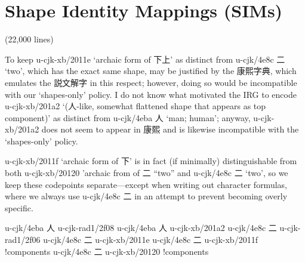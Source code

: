 \begin{multicols}{2}
\endgroup{}\end{multicols}\null\newpage{}\begin{multicols}{2}\end{multicols}
\section{Shape Identity Mappings (SIMs)
}
\begin{multicols}{2}(22,000 lines)\mktsShowpar\par
To keep u-cjk-xb/2011e { }‘archaic form of {\cjk{}下上}’ as distinct from
u-cjk/4e8c {\cjk{}二} ‘two’, which has the
exact same shape, may be justified by the {\cjk{}康熙字典}, which
emulates the {\cjk{}説文解字} in this respect; however, doing
so would be incompatible with our ‘shapes-only’ policy. I do not know
what motivated the IRG to encode u-cjk-xb/201a2 { }‘({\cjk{}人}-like, somewhat
flattened shape that appears as top component)’ as distinct from u-cjk/4eba {\cjk{}人}
‘man; human’; anyway, u-cjk-xb/201a2 { }does not seem to appear in {\cjk{}康熙} and
is likewise incompatible with the ‘shapes-only’ policy.\mktsShowpar\par
u-cjk-xb/2011f { }‘archaic form of {\cjk{}下}’ is in fact (if minimally)
distinguishable from both u-cjk-xb/20120 { }'archaic from of {\cjk{}二} “two”
and u-cjk/4e8c {\cjk{}二} ‘two’, so we keep these codepoints separate—except
when writing out character formulas, where we always use u-cjk/4e8c {\cjk{}二}
in an attempt to prevent becoming overly specific.\mktsShowpar\par
\begingroup\mktsObeyAllLines{}

\begingroup\mktsStyleCode{}u-cjk/4eba	{\cjk{}人}	u-cjk-rad1/2f08	{} 
u-cjk/4eba	{\cjk{}人}	u-cjk-xb/201a2	{} 
u-cjk/4e8c	{\cjk{}二}	u-cjk-rad1/2f06	{} 
u-cjk/4e8c	{\cjk{}二}	u-cjk-xb/2011e	{} 
u-cjk/4e8c	{\cjk{}二}	u-cjk-xb/2011f	{}!components 
u-cjk/4e8c	{\cjk{}二}	u-cjk-xb/20120	{}!components 
\endgroup{}{}


\end{multicols}
